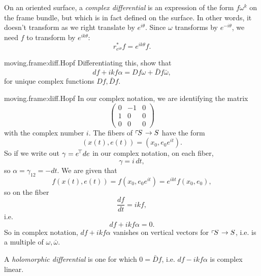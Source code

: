 %
On an oriented surface, a \emph{complex differential} is an expression of the form \(f\omega^k\) on the frame bundle, but which is in fact defined on the surface.
In other words, it doesn't transform as we right translate by \(e^{i\theta}\).
Since \(\omega\) transforms by \(e^{-i\theta}\), we need \(f\) to transform by \(e^{ik\theta}\):
\[
r_{e^{i\theta}}^*f=e^{ik\theta}f.
\]
\begin{problem}{moving.frame:diff.Hopf}
Differentiating this, show that
\[
df+ikf\alpha=Df \omega + \bar{D}f \bar\omega,
\]  
for unique complex functions \(Df,\bar{D}f\).
\end{problem}
\begin{answer}{moving.frame:diff.Hopf}
In our complex notation, we are identifying the matrix
\[
\begin{pmatrix}
0 & -1 & 0 \\
1 &  0 & 0 \\
0 & 0 & 0
\end{pmatrix}
\]
with the complex number \(i\).
The fibers of \(\left\ulcorner\!S\right. \to S\) have the form
\[
(x(t),e(t))=(x_0,e_0e^{it}).
\]
So if we write out \(\gamma=e^{\!\top}de\) in our complex notation,
on each fiber,
\[
\gamma=i \, dt,
\]
so \(\alpha=\gamma_{12}=-dt\).
We are given that
\[
f(x(t),e(t))=f(x_0,e_0e^{it})=e^{ikt}f(x_0,e_0),
\]
so on the fiber
\[
\frac{df}{dt}=ikf,
\]
i.e.
\[
df+ikf\alpha=0.
\]
So in complex notation, \(df+ikf\alpha\) vanishes on vertical vectors for \(\left\ulcorner\!S\right. \to S\), i.e. is a multiple of \(\omega,\bar\omega\).
\end{answer}
A \emph{holomorphic differential} is one for which \(0=\bar{D}f\), i.e. \(df-ikf\alpha\) is complex linear.

